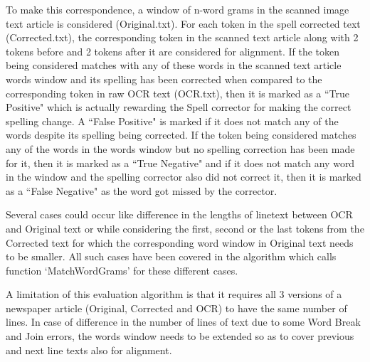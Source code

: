 \documentclass[letterpaper,11pt]{report}
\begin{document}
To make this correspondence, a window of n-word grams in the scanned image text article is considered (Original.txt). For each token in the spell corrected text (Corrected.txt), the corresponding token  in the scanned text article along with 2 tokens before and 2 tokens after it are considered for alignment. If the token being considered matches with any of these words in the scanned text article words window and its spelling has been corrected when compared to the corresponding token in raw OCR text (OCR.txt), then it is marked as a ``True Positive" which is actually rewarding the Spell corrector for making the correct spelling change. A ``False Positive" is marked if it does not match any of the words despite its spelling being corrected. If the token being considered matches any of the words in the words window but no spelling correction has been made for it, then it is marked as a ``True Negative" and if it does not match any word in the window and the spelling corrector also did not correct it, then it is marked as a ``False Negative" as the word got missed by the corrector. 

Several cases could occur like difference in the lengths of linetext between OCR and Original text or while considering the first, second or the last tokens from the Corrected text for which the corresponding word window in Original text needs to be smaller. All such cases have been covered in the algorithm which calls function `MatchWordGrams' for these different cases. 

A limitation of this evaluation algorithm is that it requires all 3 versions of a newspaper article (Original, Corrected and OCR) to have the same number of lines. In case of difference in the number of lines of text due to some Word Break and Join errors, the words window needs to be extended so as to cover previous and next line texts also for alignment.
\end{document}
